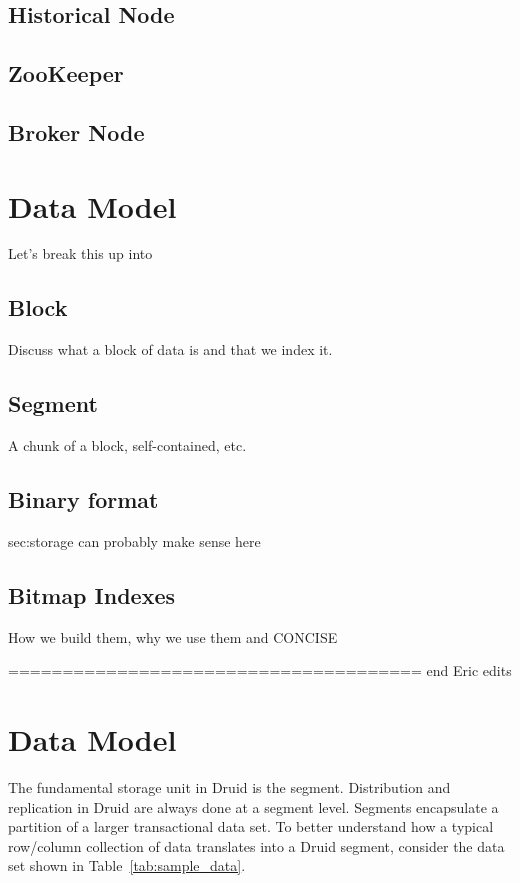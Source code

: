 \documentclass{vldb}
\begin{document}
\subsection{Historical Node}

\subsection{ZooKeeper}

\subsection{Broker Node}

\section{Data Model}
\label{sec:data-model}

Let's break this up into

\subsection{Block}

Discuss what a block of data is and that we index it.

\subsection{Segment}

A chunk of a block, self-contained, etc.

\subsection{Binary format}

sec:storage can probably make sense here

\subsection{Bitmap Indexes}

How we build them, why we use them and CONCISE



====================================== end Eric edits



\section{Data Model}
\label{sec:data-model}
The fundamental storage unit in Druid is the segment. Distribution and replication in Druid are always done at a segment level. Segments encapsulate a partition of a larger transactional data set. To better understand how a typical row/column collection of data translates into a Druid segment, consider the data set shown in Table~\ref{tab:sample_data}.
\end{document}
